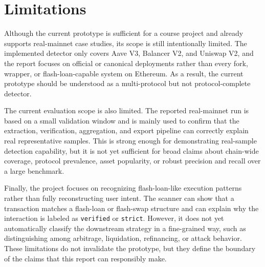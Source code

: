 \section{Limitations}

Although the current prototype is sufficient for a course project and already supports real-mainnet case studies, its scope is still intentionally limited. The implemented detector only covers Aave V3, Balancer V2, and Uniswap V2, and the report focuses on official or canonical deployments rather than every fork, wrapper, or flash-loan-capable system on Ethereum. As a result, the current prototype should be understood as a multi-protocol but not protocol-complete detector.

The current evaluation scope is also limited. The reported real-mainnet run is based on a small validation window and is mainly used to confirm that the extraction, verification, aggregation, and export pipeline can correctly explain real representative samples. This is strong enough for demonstrating real-sample detection capability, but it is not yet sufficient for broad claims about chain-wide coverage, protocol prevalence, asset popularity, or robust precision and recall over a large benchmark.

Finally, the project focuses on recognizing flash-loan-like execution patterns rather than fully reconstructing user intent. The scanner can show that a transaction matches a flash-loan or flash-swap structure and can explain why the interaction is labeled as \texttt{verified} or \texttt{strict}. However, it does not yet automatically classify the downstream strategy in a fine-grained way, such as distinguishing among arbitrage, liquidation, refinancing, or attack behavior. These limitations do not invalidate the prototype, but they define the boundary of the claims that this report can responsibly make.
